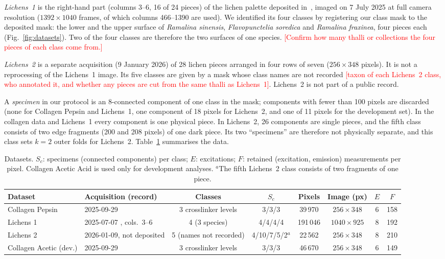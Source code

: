 \documentclass[journal]{IEEEtran}
\newcommand{\RESULT}[1]{\textcolor{red}{[#1]}}
\begin{document}
\emph{Lichens~1} is the right-hand part (columns 3--6, 16 of 24 pieces) of the lichen palette deposited in~\cite{zenodo_lichens}, imaged on 7 July 2025 at full camera resolution ($1392\times1040$ frames, of which columns 466--1390 are used). We identified its four classes by registering our class mask to the deposited mask: the lower and the upper surface of \emph{Ramalina sinensis}, \emph{Flavopunctelia soredica} and \emph{Ramalina fraxinea}, four pieces each (Fig.~\ref{fig:datasets}). Two of the four classes are therefore the two surfaces of one species. \RESULT{Confirm how many thalli or collections the four pieces of each class come from.}

\emph{Lichens~2} is a separate acquisition (9 January 2026) of 28 lichen pieces arranged in four rows of seven ($256\times348$ pixels). It is not a reprocessing of the Lichens~1 image. Its five classes are given by a mask whose class names are not recorded \RESULT{taxon of each Lichens~2 class, who annotated it, and whether any pieces are cut from the same thalli as Lichens~1}. Lichens~2 is not part of a public record.

A \emph{specimen} in our protocol is an 8-connected component of one class in the mask; components with fewer than 100 pixels are discarded (none for Collagen Pepsin and Lichens~1, one component of 18 pixels for Lichens~2, and one of 11 pixels for the development set). In the collagen data and Lichens~1 every component is one physical piece. In Lichens~2, 26 components are single pieces, and the fifth class consists of two edge fragments (200 and 208 pixels) of one dark piece. Its two ``specimens'' are therefore not physically separate, and this class sets $k=2$ outer folds for Lichens~2. Table~\ref{tab:data} summarises the data.

\begin{table}[!t]
\centering
\caption{Datasets. $S_c$: specimens (connected components) per class; $E$: excitations; $F$: retained (excitation, emission) measurements per pixel. Collagen Acetic Acid is used only for development analyses. $^a$The fifth Lichens~2 class consists of two fragments of one piece.}
\label{tab:data}
\small
\begin{tabular}{llcccccc}
\toprule
Dataset & Acquisition (record) & Classes & $S_c$ & Pixels & Image (px) & $E$ & $F$ \\
\midrule
Collagen Pepsin & 2025-09-29 \cite{zenodo_collagen} & 3 crosslinker levels & 3/3/3 & 39\,970 & $256\times348$ & 6 & 158 \\
Lichens 1 & 2025-07-07 \cite{zenodo_lichens}, cols.\ 3--6 & 4 (3 species) & 4/4/4/4 & 191\,046 & $1040\times925$ & 8 & 192 \\
Lichens 2 & 2026-01-09, not deposited & 5 (names not recorded) & 4/10/7/5/2$^a$ & 22\,562 & $256\times348$ & 8 & 210 \\
\midrule
Collagen Acetic (dev.) & 2025-09-29 \cite{zenodo_collagen} & 3 crosslinker levels & 3/3/3 & 46\,670 & $256\times348$ & 6 & 149 \\
\bottomrule
\end{tabular}
\end{table}
\end{document}
